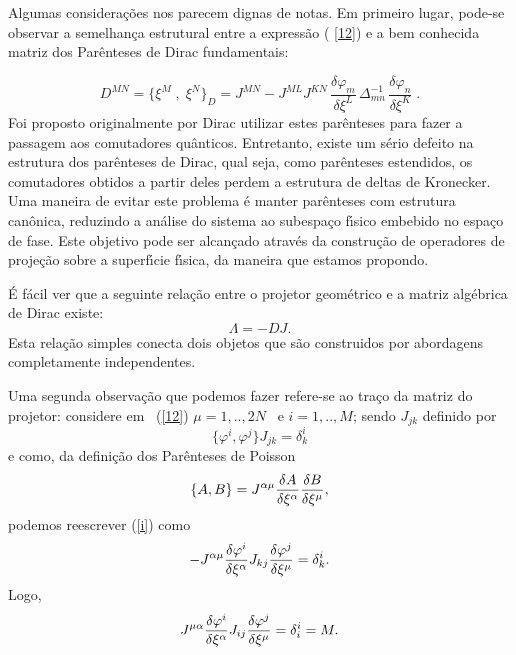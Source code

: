 \documentclass[a4paper,thmsa,12pt]{report}
\begin{document}
Algumas considera\c{c}\~{o}es nos parecem dignas de notas. Em primeiro
lugar, pode-se observar a semelhan\c{c}a estrutural entre a express\~{a}o (%
\ref{12}) e a bem conhecida matriz dos Par\^{e}nteses de Dirac fundamentais:

\begin{equation}
D^{MN}=\{\xi ^{M}\;,\;\xi ^{N}\}_{D}=J^{MN}-J^{ML}J^{KN}\,\frac{\delta
\varphi _{m}}{\delta \xi ^{L}}\,\Delta _{mn}^{-1}\,\frac{\delta \varphi _{n}%
}{\delta \xi ^{K}}\;.  \label{m10}
\end{equation}
Foi proposto originalmente por Dirac utilizar estes par\^{e}nteses para
fazer a passagem aos comutadores qu\^{a}nticos. Entretanto, existe um
s\'{e}rio defeito na estrutura dos par\^{e}nteses de Dirac, qual seja, como
par\^{e}nteses estendidos, os comutadores obtidos a partir deles perdem a
estrutura de deltas de Kronecker. Uma maneira de evitar este problema \'{e}
manter par\^{e}nteses com estrutura can\^{o}nica, reduzindo a an\'{a}lise do
sistema ao subespa\c{c}o f\'{\i}sico embebido no espa\c{c}o de fase. Este
objetivo pode ser alcan\c{c}ado atrav\'{e}s da constru\c{c}\~{a}o de
operadores de proje\c{c}\~{a}o sobre a superf\'{\i}cie f\'{\i}sica, da
maneira que estamos propondo.

\'{E} f\'{a}cil ver que a seguinte rela\c{c}\~{a}o entre o projetor
geom\'{e}trico e a matriz alg\'{e}brica de Dirac existe: 
\begin{equation}
\Lambda =-DJ.  \label{m11}
\end{equation}
Esta rela\c{c}\~{a}o simples conecta dois objetos que s\~{a}o construidos
por abordagens completamente independentes.

Uma segunda observa\c{c}\~{a}o que podemos fazer refere-se ao tra\c{c}o da
matriz do projetor: considere em \ (\ref{12}) $\mu =1,..,2N$ \ e $i=1,..,M$;
sendo $J_{jk}$ definido por 
\begin{equation}
\{\varphi ^{i},\varphi ^{j}\}J_{jk}=\delta _{k}^{i}  \label{i}
\end{equation}
e como, da defini\c{c}\~{a}o dos Par\^{e}nteses de Poisson 
\begin{equation}
\{A,B\}=J^{\alpha \mu }\frac{\delta A}{\delta \xi ^{\alpha }}\frac{\delta B}{%
\delta \xi ^{\mu }},  \label{ii}
\end{equation}
podemos reescrever (\ref{i}) como 
\begin{equation}
-J^{\alpha \mu }\frac{\delta \varphi ^{i}}{\delta \xi ^{\alpha }}J_{kj}\frac{%
\delta \varphi ^{j}}{\delta \xi ^{\mu }}=\delta _{k}^{i}.  \label{iii}
\end{equation}
Logo, 
\begin{equation}
J^{\mu \alpha }\frac{\delta \varphi ^{i}}{\delta \xi ^{\alpha }}J_{ij}\frac{%
\delta \varphi ^{j}}{\delta \xi ^{\mu }}=\delta _{i}^{i}=M.  \label{iv}
\end{equation}
\end{document}

